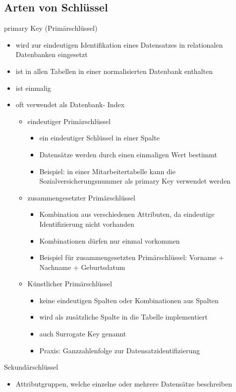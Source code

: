 \documentclass[12pt,a4paper]{report}
\begin{document}
\begin{onehalfspace}
\subsection{Arten von Schlüssel}
primary Key (Primärschlüssel)
\begin{itemize}
\item wird zur eindeutigen Identifikation eines Datensatzes in relationalen Datenbanken eingesetzt
\item ist in allen Tabellen in einer normalisierten Datenbank enthalten
\item ist einmalig
\item oft verwendet als Datenbank- Index
\begin{itemize}
\item eindeutiger Primärschlüssel
\begin{itemize}
\item ein eindeutiger Schlüssel in einer Spalte
\item Datensätze werden durch einen einmaligen Wert bestimmt
\item Beispiel: in einer  Mitarbeitertabelle kann die Sozialversicherungsnummer als primary Key verwendet werden
\end{itemize}
\item zusammengesetzter Primärschlüssel
\begin{itemize}
\item Kombination aus verschiedenen Attributen, da eindeutige Identifizierung nicht vorhanden
\item Kombinationen dürfen nur einmal vorkommen
\item Beispiel für zusammengesetzten Primärschlüssel: Vorname + Nachname + Geburtsdatum
\end{itemize}
\item Künstlicher Primärschlüssel
\begin{itemize}
\item keine eindeutigen Spalten oder Kombinationen aus Spalten
\item wird als zusätzliche Spalte in die Tabelle implementiert
\item auch Surrogate Key genannt
\item Praxis: Ganzzahlenfolge zur Datensatzidentifizierung
\end{itemize}
\end{itemize}
\end{itemize}
Sekundärschlüssel
\begin{itemize}
\item Attributgruppen, welche einzelne oder mehrere Datensätze beschreiben

\end{itemize}
\end{onehalfspace}
\end{document}
